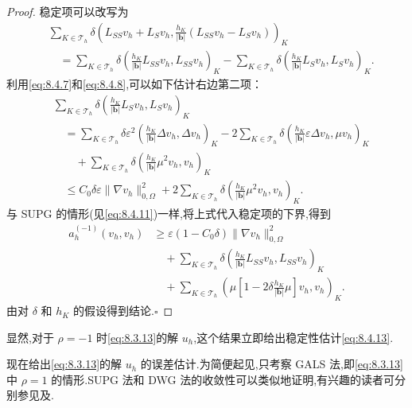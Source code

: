 \begin{proof}
稳定项可以改写为
\[
  \begin{aligned}
    &\sum_{K\in\mathcal T_h}\delta\left(L_{SS}v_h+L_Sv_h,
        \frac{h_K}{|\boldsymbol{b}|}(L_{SS}v_h-L_Sv_h)\right)_K\\
    &\quad=\sum_{K\in\mathcal T_h}\delta\left(\frac{h_K}{|\boldsymbol{b}|}L_{SS}v_h,L_{SS}v_h\right)_K
         -\sum_{K\in\mathcal T_h}\delta\left(\frac{h_K}{|\boldsymbol{b}|}L_Sv_h,L_Sv_h\right)_K .
  \end{aligned}
\]
利用\eqref{eq:8.4.7}和\eqref{eq:8.4.8},可以如下估计右边第二项：
\[
  \begin{aligned}
    &\sum_{K\in\mathcal T_h}\delta\left(\frac{h_K}{|\boldsymbol{b}|}L_Sv_h,L_Sv_h\right)_K\\
    &\quad=\sum_{K\in\mathcal T_h}\delta\varepsilon^2
            \left(\frac{h_K}{|\boldsymbol{b}|}\Delta v_h,\Delta v_h\right)_K
         -2\sum_{K\in\mathcal T_h}\delta
            \left(\frac{h_K}{|\boldsymbol{b}|}\varepsilon\Delta v_h,\mu v_h\right)_K\\
    &\qquad+\sum_{K\in\mathcal T_h}\delta
             \left(\frac{h_K}{|\boldsymbol{b}|}\mu^2v_h,v_h\right)_K\\
    &\quad\le C_0\delta\varepsilon\|\nabla v_h\|_{0,\Omega}^2+
         2\sum_{K\in\mathcal T_h}\delta
             \left(\frac{h_K}{|\boldsymbol{b}|}\mu^2v_h,v_h\right)_K .
  \end{aligned}
\]
与 SUPG 的情形(见\eqref{eq:8.4.11})一样,将上式代入稳定项的下界,得到
\begin{equation}\label{eq:8.4.17}
  \begin{aligned}
    a_h^{(-1)}(v_h,v_h)
      &\ge\varepsilon(1-C_0\delta)\|\nabla v_h\|_{0,\Omega}^2\\
      &\quad+\sum_{K\in\mathcal T_h}\delta
           \left(\frac{h_K}{|\boldsymbol{b}|}L_{SS}v_h,L_{SS}v_h\right)_K\\
      &\quad+\sum_{K\in\mathcal T_h}
           \left(\mu\left[1-2\delta\frac{h_K}{|\boldsymbol{b}|}\mu\right]v_h,v_h\right)_K .
  \end{aligned}
\end{equation}
由对 \(\delta\) 和 \(h_K\) 的假设得到结论.\hfill\(\square\)
\end{proof}

显然,对于 \(\rho=-1\) 时\eqref{eq:8.3.13}的解 \(u_h\),这个结果立即给出稳定性估计\eqref{eq:8.4.13}.

现在给出\eqref{eq:8.3.13}的解 \(u_h\) 的误差估计.为简便起见,只考察 GALS 法,即\eqref{eq:8.3.13}中 \(\rho=1\) 的情形.SUPG 法和 DWG 法的收敛性可以类似地证明,有兴趣的读者可分别参见及.

